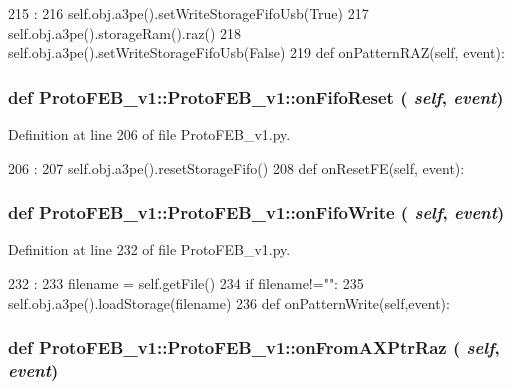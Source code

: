 \begin{DoxyCode}
215                               :
216         self.obj.a3pe().setWriteStorageFifoUsb(True)
217         self.obj.a3pe().storageRam().raz()
218         self.obj.a3pe().setWriteStorageFifoUsb(False)
219 
    def onPatternRAZ(self, event):
\end{DoxyCode}
\hypertarget{classProtoFEB__v1_1_1ProtoFEB__v1_a40f59108a553f6e2d05ae7fcf90ecec9}{
\subsubsection[{onFifoReset}]{\setlength{\rightskip}{0pt plus 5cm}def ProtoFEB\_\-v1::ProtoFEB\_\-v1::onFifoReset ( {\em self}, \/   {\em event})}}
\label{classProtoFEB__v1_1_1ProtoFEB__v1_a40f59108a553f6e2d05ae7fcf90ecec9}


Definition at line 206 of file ProtoFEB\_\-v1.py.


\begin{DoxyCode}
206                                 :
207         self.obj.a3pe().resetStorageFifo()
208 
    def onResetFE(self, event):
\end{DoxyCode}
\hypertarget{classProtoFEB__v1_1_1ProtoFEB__v1_ac0c5e2e8457b1e9804901df49ae66161}{
\subsubsection[{onFifoWrite}]{\setlength{\rightskip}{0pt plus 5cm}def ProtoFEB\_\-v1::ProtoFEB\_\-v1::onFifoWrite ( {\em self}, \/   {\em event})}}
\label{classProtoFEB__v1_1_1ProtoFEB__v1_ac0c5e2e8457b1e9804901df49ae66161}


Definition at line 232 of file ProtoFEB\_\-v1.py.


\begin{DoxyCode}
232                                :
233         filename = self.getFile()
234         if filename!="":
235             self.obj.a3pe().loadStorage(filename)
236 
    def onPatternWrite(self,event):
\end{DoxyCode}
\hypertarget{classProtoFEB__v1_1_1ProtoFEB__v1_ad8e08eb51a50c8f4f2e963a5481ae172}{
\subsubsection[{onFromAXPtrRaz}]{\setlength{\rightskip}{0pt plus 5cm}def ProtoFEB\_\-v1::ProtoFEB\_\-v1::onFromAXPtrRaz ( {\em self}, \/   {\em event})}}
\label{classProtoFEB__v1_1_1ProtoFEB__v1_ad8e08eb51a50c8f4f2e963a5481ae172}


